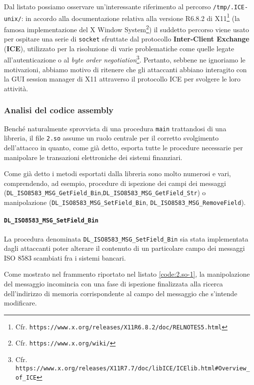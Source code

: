 \documentclass[10pt,a4paper, titlepage]{report}
\begin{document}
Dal listato possiamo osservare un'interessante riferimento al percorso \texttt{/tmp/.ICE-unix/}: in accordo alla documentazione relativa alla versione R6.8.2 di X11\footnote{Cfr. \texttt{https://www.x.org/releases/X11R6.8.2/doc/RELNOTES5.html}} (la famosa implementazione del X Window System\footnote{Cfr. \texttt{https://www.x.org/wiki/}}) il suddetto percorso viene usato per ospitare una serie di \texttt{socket} sfruttate dal protocollo \textbf{Inter-Client Exchange} (\textbf{ICE}), utilizzato per la risoluzione di varie problematiche come quelle legate all'autenticazione o al \textit{byte order negotiation}\footnote{Cfr. \texttt{https://www.x.org/releases/X11R7.7/doc/libICE/ICElib.html\#Overview\_of\_ICE}}. Pertanto, sebbene ne ignoriamo le motivazioni, abbiamo motivo di ritenere che gli attaccanti abbiano interagito con la GUI session manager di X11 attraverso il protocollo ICE per svolgere le loro attività.

\subsubsection{Analisi del codice assembly}

Benché naturalmente sprovvista di una procedura \texttt{main} trattandosi di una libreria, il file \texttt{2.so} assume un ruolo centrale per il corretto svolgimento dell'attacco in quanto, come già detto, esporta tutte le procedure necessarie per manipolare le transazioni elettroniche dei sistemi finanziari.

Come già detto i metodi esportati dalla libreria sono molto numerosi e vari, comprendendo, ad esempio, procedure di ispezione dei campi dei messaggi (\texttt{DL\_ISO8583\_MSG\_GetField\_Bin},\texttt{DL\_ISO8583\_MSG\_GetField\_Str}) o manipolazione (\texttt{DL\_ISO8583\_MSG\_SetField\_Bin}, \texttt{DL\_ISO8583\_MSG\_RemoveField}).

\paragraph{\texttt{DL\_ISO8583\_MSG\_SetField\_Bin}}

La procedura denominata \texttt{DL\_ISO8583\_MSG\_SetField\_Bin} sia stata implementata dagli attaccanti poter alterare il contenuto di un particolare campo dei messaggi ISO 8583 scambiati fra i sistemi bancari.

Come mostrato nel frammento riportato nel listato \ref{code:2.so-1}, la manipolazione del messaggio incomincia con una fase di ispezione finalizzata alla ricerca dell'indirizzo di memoria corrispondente al campo del messaggio che s'intende modificare. 
\end{document}
